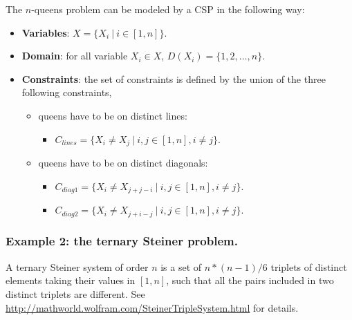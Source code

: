 The $n$-queens problem can be modeled by a CSP in the following way:
\begin{itemize}
	\item \textbf{Variables}: $X = \{X_{i}\ |\ i\in [1,n]\}$.
	\item \textbf{Domain}: for all variable $X_{i}\in X$, $D(X_{i}) = \{1,2,\ldots, n\}$.
	\item \textbf{Constraints}: the set of constraints is defined by the union of the three following constraints,
	\begin{itemize}
		\item queens have to be on distinct lines:
		\begin{itemize}
			\item $C_{lines} = \{X_{i}\neq X_{j}\ |\ i,j\in [1,n], i\neq j\}$.
		\end{itemize}
		\item queens have to be on distinct diagonals:
		\begin{itemize}
			\item $C_{diag1} = \{X_{i}\neq X_{j+j-i}\ |\ i,j\in [1,n], i\neq j\}$.
			\item $C_{diag2} = \{X_{i}\neq X_{j+i-j}\ |\ i,j\in [1,n], i\neq j\}$.
		\end{itemize}
	\end{itemize}
\end{itemize}

\subsubsection{Example 2: the ternary Steiner problem.}\label{introduction:example2:theternarysteinerproblem}\hypertarget{introduction:example2:theternarysteinerproblem}{}
A ternary Steiner system of order $n$ is a set of $n*(n-1)/6$ triplets of distinct elements taking their values in $[1,n]$, such that all the pairs included in two distinct triplets are different.
See \url{http://mathworld.wolfram.com/SteinerTripleSystem.html} for details. 


